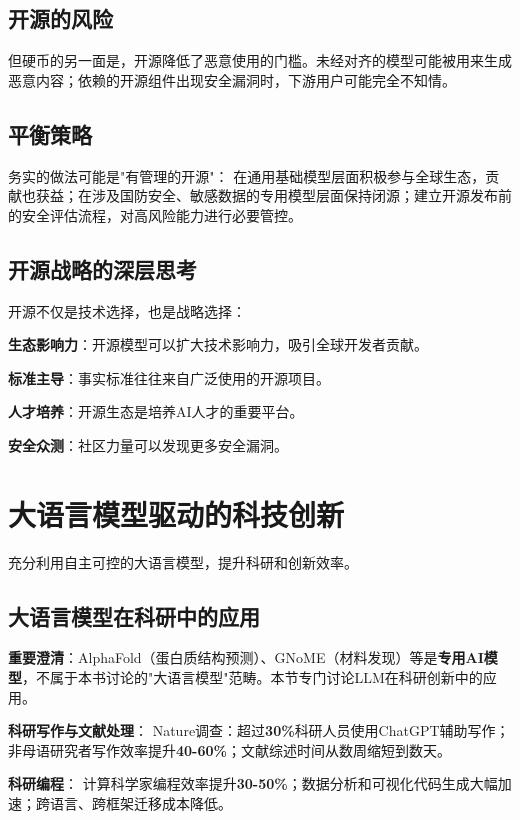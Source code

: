 \subsection{开源的风险}

但硬币的另一面是，开源降低了恶意使用的门槛。未经对齐的模型可能被用来生成恶意内容；依赖的开源组件出现安全漏洞时，下游用户可能完全不知情。

\subsection{平衡策略}

务实的做法可能是"有管理的开源"：
在通用基础模型层面积极参与全球生态，贡献也获益；在涉及国防安全、敏感数据的专用模型层面保持闭源；建立开源发布前的安全评估流程，对高风险能力进行必要管控。

\subsection{开源战略的深层思考}

开源不仅是技术选择，也是战略选择：

\textbf{生态影响力}：开源模型可以扩大技术影响力，吸引全球开发者贡献。

\textbf{标准主导}：事实标准往往来自广泛使用的开源项目。

\textbf{人才培养}：开源生态是培养AI人才的重要平台。

\textbf{安全众测}：社区力量可以发现更多安全漏洞。

\section{大语言模型驱动的科技创新}

充分利用自主可控的大语言模型，提升科研和创新效率。

\subsection{大语言模型在科研中的应用}

\textbf{重要澄清}：AlphaFold（蛋白质结构预测）、GNoME（材料发现）等是\textbf{专用AI模型}，不属于本书讨论的"大语言模型"范畴。本节专门讨论LLM在科研创新中的应用。

\textbf{科研写作与文献处理}：
Nature调查：超过\textbf{30\%}科研人员使用ChatGPT辅助写作；非母语研究者写作效率提升\textbf{40-60\%}；文献综述时间从数周缩短到数天。

\textbf{科研编程}：
计算科学家编程效率提升\textbf{30-50\%}；数据分析和可视化代码生成大幅加速；跨语言、跨框架迁移成本降低。

